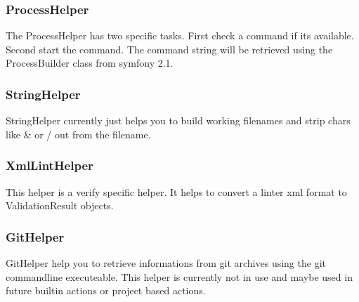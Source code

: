 \noindent
\begin{minipage}{\textwidth}
\vspace{1.5em}
\subsubsection{ProcessHelper}
The ProcessHelper has two specific tasks. First check a command if its available. Second start the command. The command string will be retrieved using the ProcessBuilder class from symfony 2.1.
\end{minipage}

\noindent
\begin{minipage}{\textwidth}
\vspace{1.5em}
\subsubsection{StringHelper}
StringHelper currently just helps you to build working filenames and strip chars like \& or / out from the filename.
\end{minipage}

\noindent
\begin{minipage}{\textwidth}
\vspace{1.5em}
\subsubsection{XmlLintHelper}
This helper is a verify specific helper. It helps to convert a linter xml format to ValidationResult objects.
\end{minipage}


\noindent
\begin{minipage}{\textwidth}
\vspace{1.5em}
\subsubsection{GitHelper}
GitHelper help you to retrieve informations from git archives using the git commandline executeable. This helper is currently not in use and maybe used in future builtin actions or project based actions.
\end{minipage}

